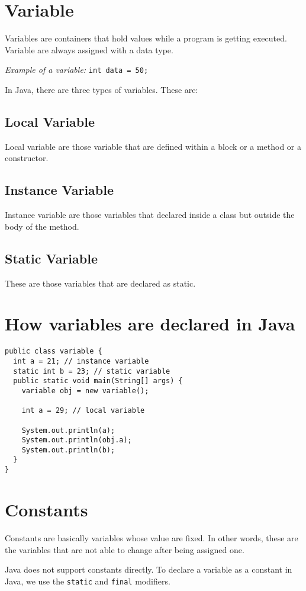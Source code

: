 \documentclass[a4paper, 12pt]{scrarticle}
\begin{document}
\section{Variable}
Variables are containers that hold values while a program is getting executed. Variable are always assigned with a data type.

\textit{Example of a variable:}
\verb|int data = 50;|

In Java, there are three types of variables. These are:

\subsection{Local Variable}
Local variable are those variable that are defined within a block or a method or a constructor.

\subsection{Instance Variable}
Instance variable are those variables that declared inside a class but outside the body of the method.

\subsection{Static Variable}
These are those variables that are declared as static.

\section{How variables are declared in Java}
\begin{verbatim}
public class variable {
  int a = 21; // instance variable
  static int b = 23; // static variable 
  public static void main(String[] args) {
    variable obj = new variable();

    int a = 29; // local variable

    System.out.println(a);
    System.out.println(obj.a);
    System.out.println(b);
  }
}
\end{verbatim}

\section{Constants}
Constants are basically variables whose value are fixed. In other words, these are the variables that are not able to change after being assigned one.

Java does not support constants directly. To declare a variable as a constant in Java, we use the \verb+static+ and \verb+final+ modifiers.
\end{document}
